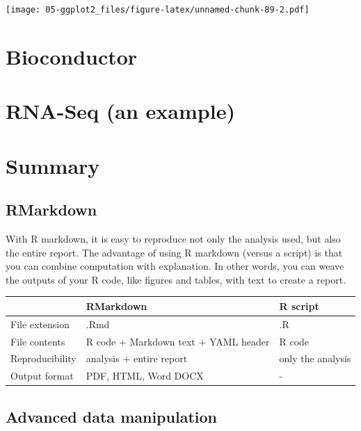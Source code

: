 \documentclass[
]{book}
\begin{document}
\texttt{[image: 05-ggplot2\_files/figure-latex/unnamed-chunk-89-2.pdf]}

\hypertarget{bioconductor}{%
\chapter{Bioconductor}\label{bioconductor}}

\hypertarget{rna-seq-an-example}{%
\chapter{RNA-Seq (an example)}\label{rna-seq-an-example}}

\hypertarget{summary}{%
\chapter{Summary}\label{summary}}

\hypertarget{rmarkdown-2}{%
\section{RMarkdown}\label{rmarkdown-2}}

With R markdown, it is easy to reproduce not only the analysis used, but also the entire report. The advantage of using R markdown (versus a script) is that you can combine computation with explanation. In other words, you can weave the outputs of your R code, like figures and tables, with text to create a report.

\begin{longtable}[]{@{}lll@{}}
\toprule
& RMarkdown & R script \\
\midrule
\endhead
File extension & .Rmd & .R \\
File contents & R code + Markdown text + YAML header & R code \\
Reproducibility & analysis + entire report & only the analysis \\
Output format & PDF, HTML, Word DOCX & - \\
\bottomrule
\end{longtable}

\hypertarget{advanced-data-manipulation-1}{%
\section{Advanced data manipulation}\label{advanced-data-manipulation-1}}
\end{document}

